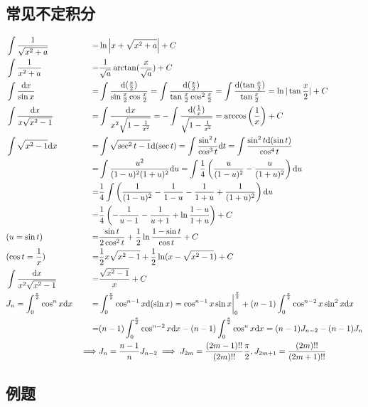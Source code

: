 \documentclass[./main.tex]{subfiles}
\begin{document}
\subsection{常见不定积分}
\vspace{-3em}
\begin{align*}
&\int\frac{1}{\sqrt{x^2+a}}&=&\ln\left|x+\sqrt{x^2+a}\right|+C\\
&\int\frac{1}{x^2+a}&=&\frac{1}{\sqrt{a}}\arctan(\frac{x}{\sqrt{a}})+C\\
&\int\frac{\text{d}x}{\sin x}&=&\int\frac{\text{d}(\frac{x}{2})}{\sin\frac{x}{2}\cos\frac{x}{2}}=\int\frac{\text{d}(\frac{x}{2})}{\tan\frac{x}{2}\cos^2\frac{x}{2}}=\int\frac{\text{d}(\tan\frac{x}{2})}{\tan\frac{x}{2}}=\ln|\tan\frac{x}{2}|+C \\
&\int\frac{\text{d}x}{x\sqrt{x^2-1}}&=&\int\frac{\text{d}x}{x^2\sqrt{1-\frac{1}{x^2}}}=-\int\frac{\text{d}(\frac{1}{x})}{\sqrt{1-\frac{1}{x^2}}}=\arccos\left(\frac{1}{x}\right)+C\\
&\int\sqrt{x^2-1}\text{d}x&=&\int\sqrt{\sec^2t-1}\text{d}(\sec t)=\int\frac{\sin^2t}{\cos^3t}\text{d}t=\int\frac{\sin^2t\text{d}(\sin t)}{\cos^4t}\\&&=&\int\frac{u^2}{(1-u)^2(1+u)^2}\text{d}u=\int\frac{1}{4}\left(\frac{u}{(1-u)^2}-\frac{u}{(1+u)^2}\right)\text{d}u\\&&=&\frac{1}{4}\int\left(\frac{1}{(1-u)^2}-\frac{1}{1-u}-\frac{1}{1+u}+\frac{1}{(1+u)^2}\right)\text{d}u\\&&=&\frac{1}{4}\left(-\frac{1}{u-1}-\frac{1}{u+1}+\ln\frac{1-u}{1+u}\right)+C\\&(u=\sin t)&=&\frac{\sin t}{2\cos^2t}+\frac{1}{2}\ln\frac{1-\sin t}{\cos t}+C\\&(\cos t=\frac{1}{x})&=&\frac{1}{2}x\sqrt{x^2-1}+\frac{1}{2}\ln(x-\sqrt{x^2-1})+C\\
&\int\frac{\text{d}x}{x^2\sqrt{x^2-1}}&=&\frac{\sqrt{x^2-1}}{x}+C\\
&J_n=\int_0^{\frac{\pi}{2}}\cos^nx\text{d}x&=&\int_0^{\frac{\pi}{2}}\cos^{n-1}x\text{d}(\sin x)=\cos^{n-1}x\sin x\bigg\vert_0^{\frac{\pi}{2}}+(n-1)\int_0^{\frac{\pi}{2}}\cos^{n-2}x\sin^2x\text{d}x\\&&=&(n-1)\int_0^{\frac{\pi}{2}}\cos^{n-2}x\text{d}x-(n-1)\int_0^{\frac{\pi}{2}}\cos^nx\text{d}x=(n-1)J_{n-2}-(n-1)J_n\\&&\implies&J_n=\frac{n-1}{n}J_{n-2}\implies J_{2m}=\frac{(2m-1)!!}{(2m)!!}\frac{\pi}{2},J_{2m+1}=\frac{(2m)!!}{(2m+1)!!}
\end{align*}
\subsection{例题}
\end{document}
